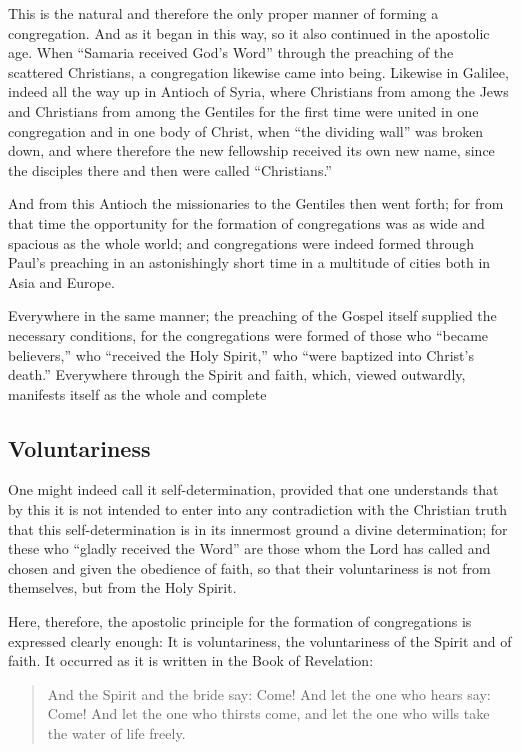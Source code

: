 This is the natural and therefore the only proper manner of forming a congregation. And as it began in this way, so it also continued in the apostolic age. When “Samaria received God’s Word” through the preaching of the scattered Christians, a congregation likewise came into being. Likewise in Galilee, indeed all the way up in Antioch of Syria, where Christians from among the Jews and Christians from among the Gentiles for the first time were united in one congregation and in one body of Christ, when “the dividing wall” was broken down, and where therefore the new fellowship received its own new name, since the disciples there and then were called “Christians.”

And from this Antioch the missionaries to the Gentiles then went forth; for from that time the opportunity for the formation of congregations was as wide and spacious as the whole world; and congregations were indeed formed through Paul’s preaching in an astonishingly short time in a multitude of cities both in Asia and Europe.

Everywhere in the same manner; the preaching of the Gospel itself supplied the necessary conditions, for the congregations were formed of those who “became believers,” who “received the Holy Spirit,” who “were baptized into Christ’s death.” Everywhere through the Spirit and faith, which, viewed outwardly, manifests itself as the whole and complete

\subsection{Voluntariness}

One might indeed call it self-determination, provided that one understands that by this it is not intended to enter into any contradiction with the Christian truth that this self-determination is in its innermost ground a divine determination; for these who “gladly received the Word” are those whom the Lord has called and chosen and given the obedience of faith, so that their voluntariness is not from themselves, but from the Holy Spirit.

Here, therefore, the apostolic principle for the formation of congregations is expressed clearly enough: It is voluntariness, the voluntariness of the Spirit and of faith. It occurred as it is written in the Book of Revelation:

\begin{quote}
And the Spirit and the bride say: Come! And let the one who hears say: Come! And let the one who thirsts come, and let the one who wills take the water of life freely.
\end{quote}

